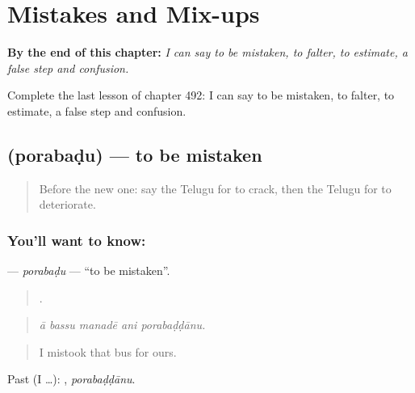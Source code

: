 
\chapter{Mistakes and Mix-ups}
\label{ch:te-mistakes-and-mix-ups}

\begin{chapteropening}
\textbf{By the end of this chapter:} \emph{I can say to be mistaken, to falter, to estimate, a false step and confusion.}

Complete the last lesson of chapter 492: I can say to be mistaken, to falter, to estimate, a false step and confusion.
\end{chapteropening}

\section[\texorpdfstring{\te{పొరబడు} (porabaḍu)}{పొరబడు (porabaḍu)}]{ (porabaḍu) — to be mistaken}

\label{lesson:TE-C492-porabadu}



\begin{quote}
Before the new one: say the Telugu for to crack, then the Telugu for to deteriorate.
\end{quote}

\subsection*{You'll want to know: }
\textbf{} — \emph{porabaḍu} — \textquotedblleft{}to be mistaken\textquotedblright{}.

\begin{quote}
    .
\end{quote}

\begin{quote}
\emph{ā bassu manadē ani porabaḍḍānu.}
\end{quote}

\begin{quote}
I mistook that bus for ours.
\end{quote}

Past (I …): , \emph{porabaḍḍānu}.

